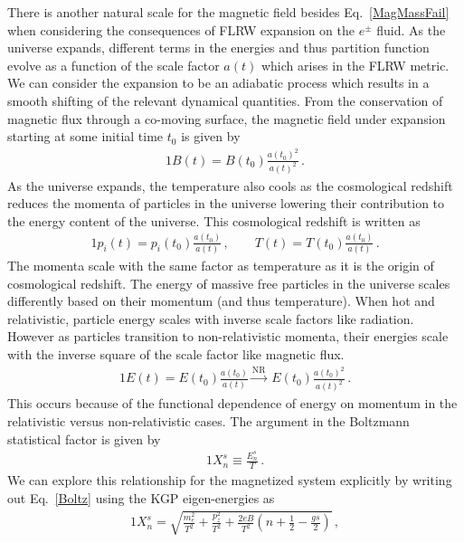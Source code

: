 \documentclass[Universe,article,submit,moreauthors,pdftex]{Definitions/mdpi}
\newcommand*{\req}[1]{Eq.~{\eqref{#1}}}
\begin{document}
There is another natural scale for the magnetic field besides \req{MagMassFail} when considering the consequences of FLRW expansion on the $e^{\pm}$ fluid. As the universe expands, different terms in the energies and thus partition function evolve as a function of the scale factor $a(t)$ which arises in the FLRW metric. We can consider the expansion to be an adiabatic process which results in a smooth shifting of the relevant dynamical quantities. From the conservation of magnetic flux through a co-moving surface, the magnetic field under expansion starting at some initial time $t_{0}$ is given by
\begin{alignat}{1}
    \label{BScale} B(t) = B(t_{0})\frac{a(t_{0})^{2}}{a(t)^{2}}\,.
\end{alignat}
As the universe expands, the temperature also cools as the cosmological redshift reduces the momenta of particles in the universe lowering their contribution to the energy content of the universe. This cosmological redshift is written as
\begin{alignat}{1}
  \label{Redshift} p_{i}(t) = p_{i}(t_{0})\frac{a(t_{0})}{a(t)}\,,\qquad T(t) = T(t_{0})\frac{a(t_{0})}{a(t)}\,.
\end{alignat}
The momenta scale with the same factor as temperature as it is the origin of cosmological redshift. The energy of massive free particles in the universe scales differently based on their momentum (and thus temperature). When hot and relativistic, particle energy scales with inverse scale factors like radiation. However as particles transition to non-relativistic momenta, their energies scale with the inverse square of the scale factor like magnetic flux.
\begin{alignat}{1}
    \label{EScale} E(t) = E(t_{0})\frac{a(t_{0})}{a(t)}\xrightarrow{\mathrm{NR}}\  E(t_{0})\frac{a(t_{0})^{2}}{a(t)^{2}}\,.
\end{alignat}
This occurs because of the functional dependence of energy on momentum in the relativistic versus non-relativistic cases. The argument in the Boltzmann statistical factor is given by
\begin{alignat}{1}
    \label{Boltz} X_{n}^{s}\equiv\frac{E_{n}^{s}}{T}\,.
\end{alignat}
We can explore this relationship for the magnetized system explicitly by writing out \req{Boltz} using the KGP eigen-energies as
\begin{alignat}{1}
    \label{XExplicit} X_{n}^{s} = \sqrt{\frac{m_{e}^{2}}{T^{2}}+\frac{p_{z}^{2}}{T^{2}}+\frac{2eB}{T^{2}}\left(n+\frac{1}{2}-\frac{gs}{2}\right)}\,,
\end{alignat}
\end{document}
